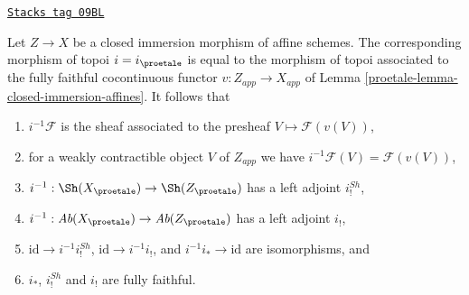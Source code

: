 \begin{lemma}
\label{proetale-lemma-closed-immersion-affines-apply}
\href{https://stacks.math.columbia.edu/tag/09BL}{\texttt{Stacks tag 09BL}}

Let $Z \to X$ be a closed immersion morphism of affine schemes.
The corresponding morphism of topoi $i = i_\proetale$
is equal to the morphism of topoi
associated to the fully faithful cocontinuous functor
$v : Z_{app} \to X_{app}$ of Lemma \ref{proetale-lemma-closed-immersion-affines}.
It follows that
\begin{enumerate}
\item $i^{-1}\mathcal{F}$ is the sheaf associated to the presheaf
$V \mapsto \mathcal{F}(v(V))$,
\item for a weakly contractible object $V$ of $Z_{app}$ we have
$i^{-1}\mathcal{F}(V) = \mathcal{F}(v(V))$,
\item $i^{-1} : \Sh(X_\proetale) \to \Sh(Z_\proetale)$
has a left adjoint $i^{Sh}_!$,
\item $i^{-1} : \textit{Ab}(X_\proetale) \to \textit{Ab}(Z_\proetale)$
has a left adjoint $i_!$,
\item $\text{id} \to i^{-1}i^{Sh}_!$, $\text{id} \to i^{-1}i_!$, and
$i^{-1}i_* \to \text{id}$ are isomorphisms, and
\item $i_*$, $i^{Sh}_!$ and $i_!$ are fully faithful.
\end{enumerate}
\end{lemma}


